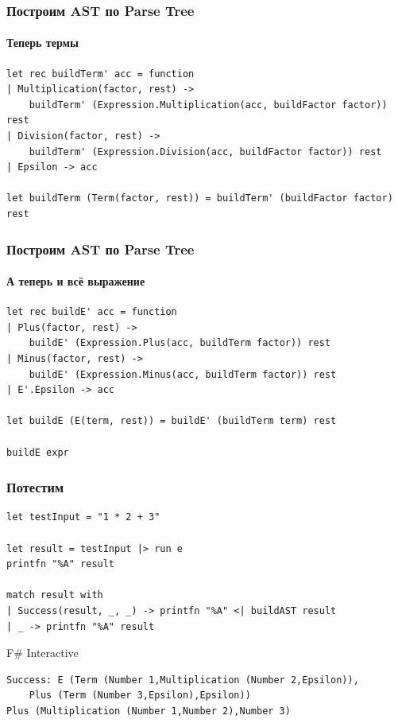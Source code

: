 \documentclass[xetex,mathserif,serif]{beamer}
\begin{document}
    \begin{frame}[fragile]
        \frametitle{Построим AST по Parse Tree}
        \framesubtitle{Теперь термы}
        \begin{verbatim}
let rec buildTerm' acc = function
| Multiplication(factor, rest) -> 
    buildTerm' (Expression.Multiplication(acc, buildFactor factor)) rest
| Division(factor, rest) -> 
    buildTerm' (Expression.Division(acc, buildFactor factor)) rest
| Epsilon -> acc

let buildTerm (Term(factor, rest)) = buildTerm' (buildFactor factor) rest
        \end{verbatim}
    \end{frame}

    \begin{frame}[fragile]
        \frametitle{Построим AST по Parse Tree}
        \framesubtitle{А теперь и всё выражение}
        \begin{verbatim}
let rec buildE' acc = function
| Plus(factor, rest) -> 
    buildE' (Expression.Plus(acc, buildTerm factor)) rest
| Minus(factor, rest) -> 
    buildE' (Expression.Minus(acc, buildTerm factor)) rest
| E'.Epsilon -> acc

let buildE (E(term, rest)) = buildE' (buildTerm term) rest

buildE expr
        \end{verbatim}
    \end{frame}

    \begin{frame}[fragile]
        \frametitle{Потестим}
        \begin{verbatim}
let testInput = "1 * 2 + 3"

let result = testInput |> run e
printfn "%A" result

match result with
| Success(result, _, _) -> printfn "%A" <| buildAST result
| _ -> printfn "%A" result
        \end{verbatim}

        \begin{exampleblock}{F\# Interactive}
            \begin{verbatim}
Success: E (Term (Number 1,Multiplication (Number 2,Epsilon)),
    Plus (Term (Number 3,Epsilon),Epsilon))
Plus (Multiplication (Number 1,Number 2),Number 3)
            \end{verbatim}
        \end{exampleblock}
    \end{frame}
\end{document}
